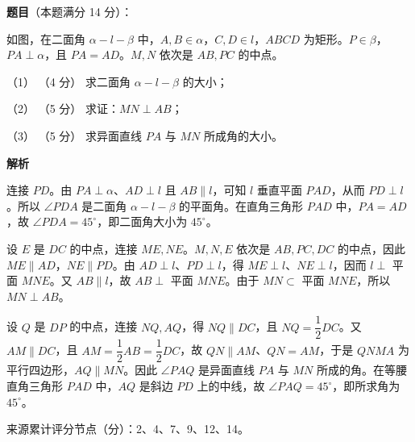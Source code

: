 \begin{answer}

\textbf{题目}（本题满分 14 分）：

如图，在二面角 $\alpha-l-\beta$ 中，$A,B\in\alpha$，$C,D\in l$，$ABCD$ 为矩形。$P\in\beta$，$PA\perp\alpha$，且 $PA=AD$。$M,N$ 依次是 $AB,PC$ 的中点。

（1） （4 分） 求二面角 $\alpha-l-\beta$ 的大小；

（2） （5 分） 求证：$MN\perp AB$；

（3） （5 分） 求异面直线 $PA$ 与 $MN$ 所成角的大小。
\nopagebreak[4]
\begin{center}\end{center}
\nopagebreak[4]
\textbf{解析}


连接 $PD$。由 $PA\perp\alpha$、$AD\perp l$ 且 $AB\parallel l$，可知 $l$ 垂直平面 $PAD$，从而 $PD\perp l$。所以 $\angle PDA$ 是二面角 $\alpha-l-\beta$ 的平面角。在直角三角形 $PAD$ 中，$PA=AD$，故 $\angle PDA=45^\circ$，即二面角大小为 $45^\circ$。


设 $E$ 是 $DC$ 的中点，连接 $ME,NE$。$M,N,E$ 依次是 $AB,PC,DC$ 的中点，因此 $ME\parallel AD$，$NE\parallel PD$。由 $AD\perp l$、$PD\perp l$，得 $ME\perp l$、$NE\perp l$，因而 $l\perp$ 平面 $MNE$。又 $AB\parallel l$，故 $AB\perp$ 平面 $MNE$。由于 $MN\subset$ 平面 $MNE$，所以 $MN\perp AB$。


设 $Q$ 是 $DP$ 的中点，连接 $NQ,AQ$，得 $NQ\parallel DC$，且 $NQ=\dfrac12DC$。又 $AM\parallel DC$，且 $AM=\dfrac12AB=\dfrac12DC$，故 $QN\parallel AM$、$QN=AM$，于是 $QNMA$ 为平行四边形，$AQ\parallel MN$。因此 $\angle PAQ$ 是异面直线 $PA$ 与 $MN$ 所成的角。在等腰直角三角形 $PAD$ 中，$AQ$ 是斜边 $PD$ 上的中线，故 $\angle PAQ=45^\circ$，即所求角为 $45^\circ$。
\nopagebreak[4]
\begin{center}\end{center}
\nopagebreak[4]
来源累计评分节点（分）：2、4、7、9、12、14。




\end{answer}
